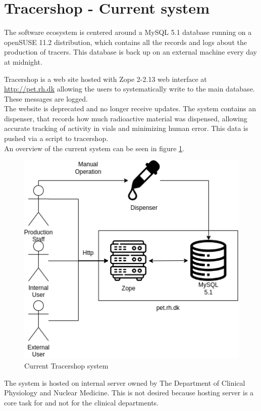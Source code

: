 \documentclass{article}
\begin{document}
\section*{Tracershop - Current system}

The software ecosystem is centered around a MySQL 5.1 database running on a
openSUSE 11.2 distribution, which contains all the records and logs about the
production of tracers. This database is back up on an external machine every day
at midnight.

Tracershop is a web site hosted with Zope 2-2.13 web interface at
\url{http://pet.rh.dk} allowing the users to systematically write to the main
database. These messages are logged.\\
The website is deprecated and no longer receive updates.
The system contains an dispenser, that records how much radioactive material was
dispensed, allowing accurate tracking of activity in vials and minimizing human
error. This data is pushed via a script to tracershop.\\
An overview of the current system can be seen in figure \ref{fig:oldsys}.
\begin{figure}[ht]
  \begin{center}
    \includegraphics[width=0.6\linewidth]{OldSetup.png}
    \caption{Current Tracershop system}
    \label{fig:oldsys}
  \end{center}
\end{figure}

The system is hosted on internal server owned by The Department of Clinical
Physiology and Nuclear Medicine. This is not desired because hosting server is a
core task for  and not for the clinical departments.
\end{document}
